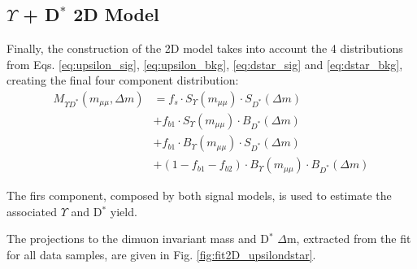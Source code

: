 \subsection{\texorpdfstring{$\Upsilon$ + D$^{*}$}{Y+D*} 2D Model}

Finally, the construction of the 2D model takes into account the 4 distributions from Eqs. \ref{eq:upsilon_sig}, \ref{eq:upsilon_bkg}, \ref{eq:dstar_sig} and \ref{eq:dstar_bkg}, creating the final four component distribution:
\begin{equation}
\begin{split}
  M_{\Upsilon D^*}(m_{\mu\mu}, \Delta m) & = f_s \cdot S_\Upsilon(m_{\mu\mu}) \cdot S_{D^*}(\Delta m) \\
  & + f_{b1} \cdot S_\Upsilon(m_{\mu\mu}) \cdot B_{D^*}(\Delta m) \\
  & + f_{b1} \cdot B_\Upsilon(m_{\mu\mu}) \cdot S_{D^*}(\Delta m) \\ 
  & + (1-f_{b1}-f_{b2}) \cdot B_\Upsilon(m_{\mu\mu}) \cdot B_{D^*}(\Delta m)
\end{split}
\end{equation}

The firs component, composed by both signal models, is used to estimate the associated $\Upsilon$ and D$^*$ yield.

The projections to the dimuon invariant mass and D$^*$ $\Delta$m, extracted from the fit for all data samples, are given in Fig. \ref{fig:fit2D_upsilondstar}.

